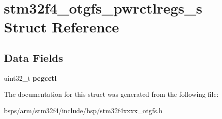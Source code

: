 \hypertarget{structstm32f4__otgfs__pwrctlregs__s}{}\section{stm32f4\+\_\+otgfs\+\_\+pwrctlregs\+\_\+s Struct Reference}
\label{structstm32f4__otgfs__pwrctlregs__s}
\subsection*{Data Fields}
\begin{DoxyCompactItemize}
\item 
\mbox{\label{structstm32f4__otgfs__pwrctlregs__s_a54ca90a6f55249fc2c37061773b1bb7b}} 
uint32\+\_\+t {\bfseries pcgcctl}
\end{DoxyCompactItemize}


The documentation for this struct was generated from the following file\+:\begin{DoxyCompactItemize}
\item 
bsps/arm/stm32f4/include/bsp/stm32f4xxxx\+\_\+otgfs.\+h\end{DoxyCompactItemize}
